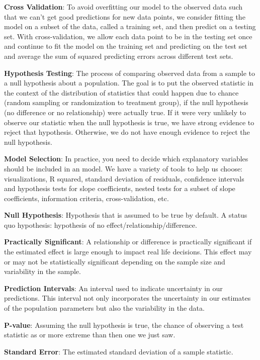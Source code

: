 \documentclass[
]{book}
\begin{document}
\textbf{Cross Validation}: To avoid overfitting our model to the observed data such that we can't get good predictions for new data points, we consider fitting the model on a subset of the data, called a training set, and then predict on a testing set. With cross-validation, we allow each data point to be in the testing set once and continue to fit the model on the training set and predicting on the test set and average the sum of squared predicting errors across different test sets.

\textbf{Hypothesis Testing}: The process of comparing observed data from a sample to a null hypothesis about a population. The goal is to put the observed statistic in the context of the distribution of statistics that could happen due to chance (random sampling or randomization to treatment group), if the null hypothesis (no difference or no relationship) were actually true. If it were very unlikely to observe our statistic when the null hypothesis is true, we have strong evidence to reject that hypothesis. Otherwise, we do not have enough evidence to reject the null hypothesis.

\textbf{Model Selection}: In practice, you need to decide which explanatory variables should be included in an model. We have a variety of tools to help us choose: visualizations, R squared, standard deviation of residuals, confidence intervals and hypothesis tests for slope coefficients, nested tests for a subset of slope coefficients, information criteria, cross-validation, etc.

\textbf{Null Hypothesis}: Hypothesis that is assumed to be true by default. A status quo hypothesis: hypothesis of no effect/relationship/difference.

\textbf{Practically Significant}: A relationship or difference is practically significant if the estimated effect is large enough to impact real life decisions. This effect may or may not be statistically significant depending on the sample size and variability in the sample.

\textbf{Prediction Intervals}: An interval used to indicate uncertainty in our predictions. This interval not only incorporates the uncertainty in our estimates of the population parameters but also the variability in the data.

\textbf{P-value}: Assuming the null hypothesis is true, the chance of observing a test statistic as or more extreme than then one we just saw.

\textbf{Standard Error}: The estimated standard deviation of a sample statistic.
\end{document}
